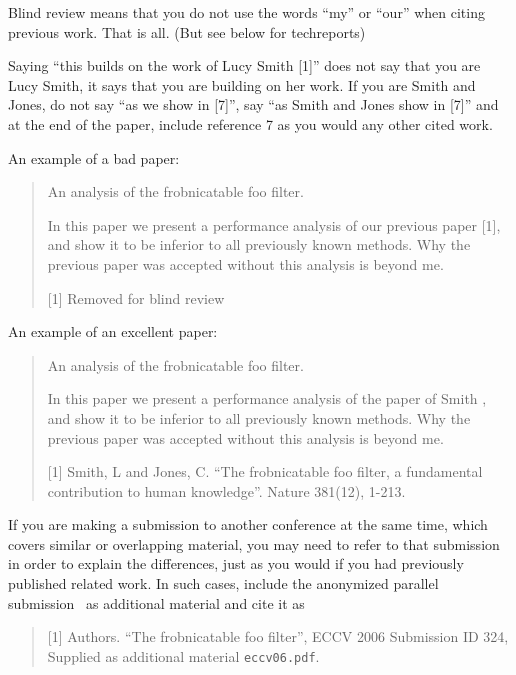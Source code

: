 \documentclass[10pt,twocolumn,letterpaper]{article}
\begin{document}
Blind review means that you do not use the words ``my'' or ``our''
when citing previous work.  That is all.  (But see below for
techreports)

Saying ``this builds on the work of Lucy Smith [1]'' does not say
that you are Lucy Smith, it says that you are building on her
work.  If you are Smith and Jones, do not say ``as we show in
[7]'', say ``as Smith and Jones show in [7]'' and at the end of the
paper, include reference 7 as you would any other cited work.

An example of a bad paper:
\begin{quote}
\begin{center}
    An analysis of the frobnicatable foo filter.
\end{center}

   In this paper we present a performance analysis of our
   previous paper [1], and show it to be inferior to all
   previously known methods.  Why the previous paper was
   accepted without this analysis is beyond me.

   [1] Removed for blind review
\end{quote}


An example of an excellent paper:

\begin{quote}
\begin{center}
     An analysis of the frobnicatable foo filter.
\end{center}

   In this paper we present a performance analysis of the
   paper of Smith \etal [1], and show it to be inferior to
   all previously known methods.  Why the previous paper
   was accepted without this analysis is beyond me.

   [1] Smith, L and Jones, C. ``The frobnicatable foo
   filter, a fundamental contribution to human knowledge''.
   Nature 381(12), 1-213.
\end{quote}

If you are making a submission to another conference at the same time,
which covers similar or overlapping material, you may need to refer to that
submission in order to explain the differences, just as you would if you
had previously published related work.  In such cases, include the
anonymized parallel submission~\cite{Authors06} as additional material and
cite it as
\begin{quote}
[1] Authors. ``The frobnicatable foo filter'', ECCV 2006 Submission ID 324,
Supplied as additional material {\tt eccv06.pdf}.
\end{quote}
\end{document}
